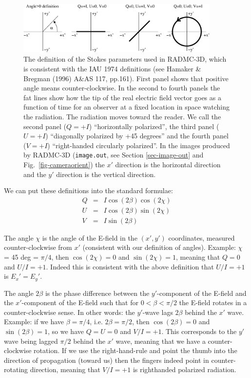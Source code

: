 \documentclass{report}
\begin{document}
%
\begin{figure}
\centerline{\includegraphics[width=0.9\textwidth]{stokes_and_angles_iaudef.eps}}
\caption{\label{fig-stokes-definition} The definition of the Stokes
  parameters used in RADMC-3D, which is consistent with the IAU 1974
  definitions (see Hamaker \& Bregman (1996) A\&AS 117, pp.161). First panel
  shows that positive angle means counter-clockwise. In the second to fourth
  panels the fat lines show how the tip of the real electric field vector
  goes as a function of time for an observer at a fixed location in space
  watching the radiation. The radiation moves toward the reader. We call the
  second panel ($Q=+I$) ``horizontally polarized'', the third panel ($U=+I$)
  ``diagonally polarized by +45 degrees'' and the fourth panel ($V=+I$)
  ``right-handed circularly polarized''. In the images produced by RADMC-3D
  ({\small\tt image.out}, see Section \ref{sec-image-out} and
  Fig.~\ref{fig-cameraorient}) the $x'$ direction is the horizontal
  direction and the $y'$ direction is the vertical direction.}
\end{figure}
%


We can put these definitions into the standard formulae:
\begin{eqnarray}
Q &=& I\cos(2\beta)\cos(2\chi)\\
U &=& I\cos(2\beta)\sin(2\chi)\\
V &=& I\sin(2\beta)
\end{eqnarray}

The angle $\chi$ is the angle of the E-field in the $(x',y')$ coordinates,
measured counter-clockwise from $x'$ (consistent with our definition
of angles). Example: $\chi$ = 45 deg = $\pi/4$, then $\cos(2\chi)=0$ and
$\sin(2\chi)=1$, meaning that $Q=0$ and $U/I=+1$. Indeed this is consistent 
with the above definition that $U/I=+1$ is $E_x'=E_y'$. 

The angle $2\beta$ is the phase difference between the $y'$-component of the
E-field and the $x'$-component of the E-field such that for $0<\beta<\pi/2$
the E-field rotates in a counter-clockwise sense. In other words: the
$y'$-wave lags $2\beta$ behind the $x'$ wave. Example: if we have
$\beta=\pi/4$, i.e.  $2\beta=\pi/2$, then $\cos(2\beta)=0$ and
$\sin(2\beta)=1$, so we have $Q=U=0$ and $V/I=+1$. This corresponds to the
$y'$ wave being lagged $\pi/2$ behind the $x'$ wave, meaning that we have a
counter-clockwise rotation. If we use the right-hand-rule and point the
thumb into the direction of propagation (toward us) then the fingers indeed
point in counter-rotating direction, meaning that $V/I=+1$ is righthanded
polarized radiation.
\end{document}
